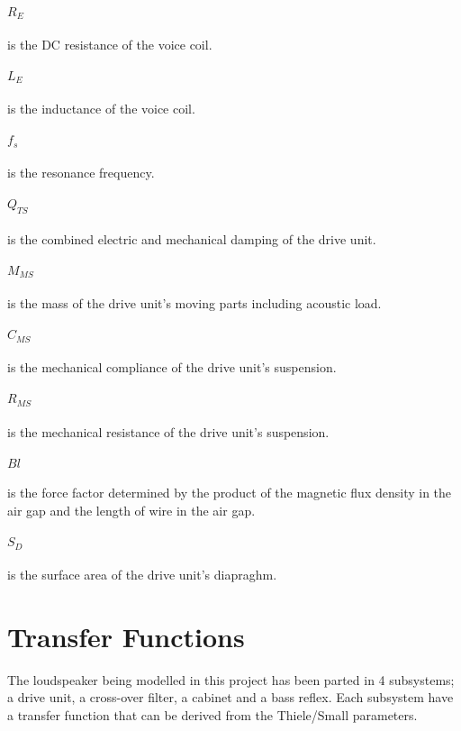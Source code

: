 \paragraph{$R_E$} is the DC resistance of the voice coil.

\paragraph{$L_E$} is the inductance of the voice coil.

\paragraph{$f_s$} is the resonance frequency.

\paragraph{$Q_{TS}$} is the combined electric and mechanical damping of the drive unit.

\paragraph{$M_{MS}$} is the mass of the drive unit's moving parts including acoustic load.

\paragraph{$C_{MS}$} is the mechanical compliance of the drive unit's suspension.

\paragraph{$R_{MS}$} is the mechanical resistance of the drive unit's suspension.

\paragraph{$Bl$} is the force factor determined by the product of the magnetic flux density in the air gap and the length of wire in the air gap.

\paragraph{$S_D$} is the surface area of the drive unit's diapraghm.

\section{Transfer Functions}
The loudspeaker being modelled in this project has been parted in 4 subsystems; a drive unit, a cross-over filter, a cabinet and a bass reflex. 
Each subsystem have a transfer function that can be derived from the Thiele/Small parameters.

